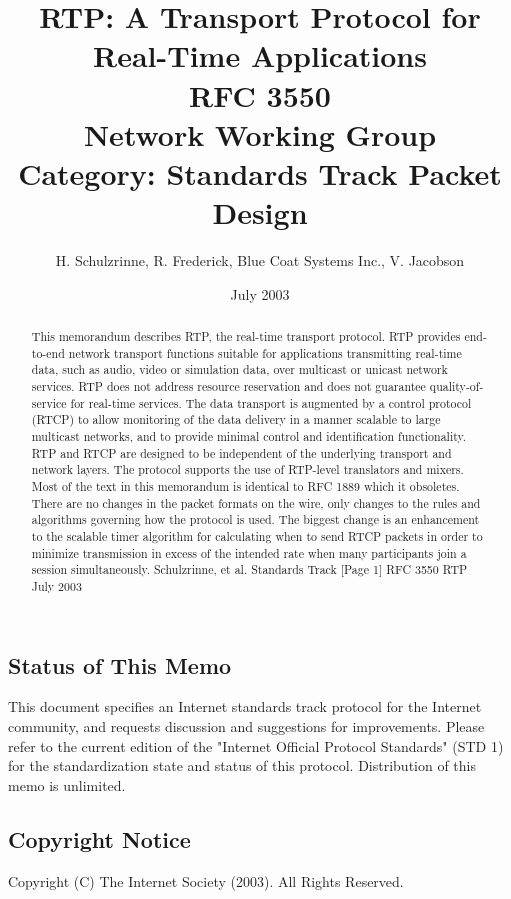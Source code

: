 \documentclass{article}
\title{RTP: A Transport Protocol for Real-Time Applications\\[1em]
\large RFC 3550\\
Network Working Group\\
Category: Standards Track                                  Packet Design}
\author{H. Schulzrinne, R. Frederick, Blue Coat Systems Inc., V. Jacobson}
\date{July 2003}
\begin{document}
\maketitle

\begin{abstract}
This memorandum describes RTP, the real-time transport protocol.  RTP provides end-to-end network transport functions suitable for applications transmitting real-time data, such as audio, video or simulation data, over multicast or unicast network services.  RTP does not address resource reservation and does not guarantee quality-of-service for real-time services.  The data transport is augmented by a control protocol (RTCP) to allow monitoring of the data delivery in a manner scalable to large multicast networks, and to provide minimal control and identification functionality.  RTP and RTCP are designed to be independent of the underlying transport and network layers.  The protocol supports the use of RTP-level translators and mixers. Most of the text in this memorandum is identical to RFC 1889 which it obsoletes.  There are no changes in the packet formats on the wire, only changes to the rules and algorithms governing how the protocol is used.  The biggest change is an enhancement to the scalable timer algorithm for calculating when to send RTCP packets in order to minimize transmission in excess of the intended rate when many participants join a session simultaneously. Schulzrinne, et al.         Standards Track                     [Page 1] RFC 3550                          RTP                          July 2003
\end{abstract}

\subsection*{Status of This Memo}
This document specifies an Internet standards track protocol for the Internet community, and requests discussion and suggestions for improvements.  Please refer to the current edition of the "Internet Official Protocol Standards" (STD 1) for the standardization state and status of this protocol.  Distribution of this memo is unlimited.

\subsection*{Copyright Notice}
Copyright (C) The Internet Society (2003).  All Rights Reserved.

\tableofcontents
\newpage
\end{document}
